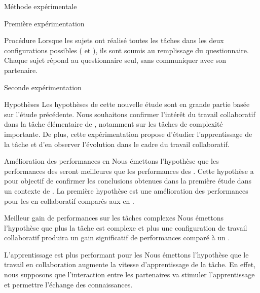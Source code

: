 \documentclass[myfrancais]{mythesis}
\begin{document}
\begin{mychapter}{Méthode expérimentale}
\begin{mysection}{Première expérimentation}
\begin{mysubsection}{Procédure}
				Lorsque les sujets ont réalisé toutes les tâches dans les deux configurations possibles ( et ), ils sont soumis au remplissage du questionnaire.
				Chaque sujet répond au questionnaire seul, sans communiquer avec son partenaire.
			\end{mysubsection}
		\end{mysection}
		\begin{mysection}{Seconde expérimentation}
			\begin{mysubsection}{Hypothèses}
				Les hypothèses de cette nouvelle étude sont en grande partie basée sur l'étude précédente.
				Nous souhaitons confirmer l'intérêt du travail collaboratif dans la tâche élémentaire de , notamment sur les tâches de complexité importante.
				De plus, cette expérimentation propose d'étudier l'apprentissage de la tâche et d'en observer l'évolution dans le cadre du travail collaboratif.
				\begin{myparagraph}{ Amélioration des performances en }
					Nous émettons l'hypothèse que les performances des  seront meilleures que les performances des .
					Cette hypothèse a pour objectif de confirmer les conclusions obtenues dans la première étude dans un contexte de .
					La première hypothèse est une amélioration des performances pour les  en collaboratif comparés aux  en .
				\end{myparagraph}
				\begin{myparagraph}{ Meilleur gain de performances sur les tâches complexes}
					Nous émettons l'hypothèse que plus la tâche est complexe et plus une configuration de travail collaboratif produira un gain significatif de performances comparé à un .
				\end{myparagraph}
				\begin{myparagraph}{ L'apprentissage est plus performant pour les }
					Nous émettons l'hypothèse que le travail en collaboration augmente la vitesse d'apprentissage de la tâche.
					En effet, nous supposons que l'interaction entre les partenaires va stimuler l'apprentissage et permettre l'échange des connaissances.

\end{myparagraph}
\end{mysubsection}
\end{mysection}
\end{mychapter}
\end{document}
